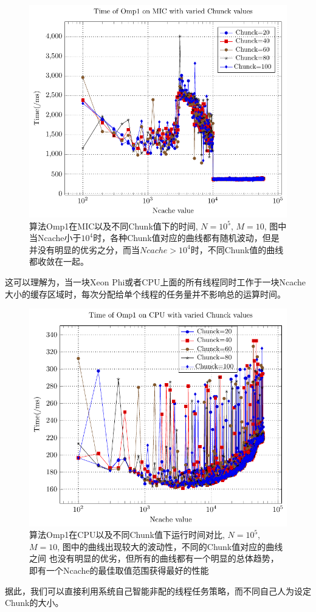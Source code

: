 

\begin{figure}[!t]
   \centering
   \includegraphics[width=\textwidth]{chap5/Figures/bsV1-mic-Time-Chunck.pdf}
   \caption{算法Omp1在MIC以及不同Chunk值下的时间, $N=10^5$, $M=10$, 图中当Ncache小于$10^4$时，各种Chunk值对应的曲线都有随机波动，但是
   并没有明显的优劣之分，而当$Ncache > 10^4$时，不同Chunk值的曲线都收敛在一起。}
   \label{fig:v1-mic-chunck-Ncache}
\end{figure}
这可以理解为，当一块Xeon Phi或者CPU上面的所有线程同时工作于一块Ncache大小的缓存区域时，每次分配给单个线程的任务量并不影响总的运算时间。
\begin{figure}[!t]
   \centering
   \includegraphics[width=\textwidth]{chap5/Figures/bsV1-CPU-Time-Chunck.pdf}
   \caption{算法Omp1在CPU以及不同Chunk值下运行时间对比, $N=10^5$, $M=10$, 图中的曲线出现较大的波动性，不同的Chunk值对应的曲线之间
   也没有明显的优劣，但所有的曲线都有一个明显的总体趋势，即有一个Ncache的最佳取值范围获得最好的性能}
   \label{fig:v1-cpu-chunck-Ncache}
\end{figure}
据此，我们可以直接利用系统自己智能非配的线程任务策略，而不同自己人为设定Chunk的大小。

